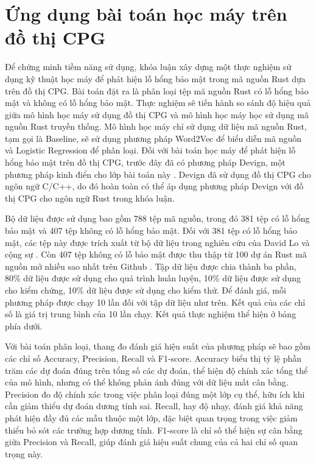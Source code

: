 \section{Ứng dụng bài toán học máy trên đồ thị CPG}


Để chứng minh tiềm năng sử dụng, khóa luận xây dựng một thực nghiệm sử dụng kỹ thuật học máy để phát hiện lỗ hổng bảo mật trong mã nguồn Rust dựa trên đồ thị CPG.
Bài toán đặt ra là phân loại tệp mã nguồn Rust có lỗ hổng bảo mật và không có lỗ hổng bảo mật.
Thực nghiệm sẽ tiến hành so sánh độ hiệu quả giữa mô hình học máy sử dụng đồ thị CPG và mô hình học máy học sử dụng mã nguồn Rust truyền thống.
Mô hình học máy chỉ sử dụng dữ liệu mã nguồn Rust, tạm gọi là Baseline, sẽ sử dụng phương pháp Word2Vec \cite{church2017word2vec} để biểu diễn mã nguồn và Logistic Regression \cite{lavalley2008logistic} để phân loại.
Đối với bài toán học máy để phát hiện lỗ hổng bảo mật trên đồ thị CPG, trước đây đã có phương pháp Devign, một phương pháp kinh điển cho lớp bài toán này \cite{zhou2019devign}.
Devign đã sử dụng đồ thị CPG cho ngôn ngữ C/C++, do đó hoàn toàn có thể áp dụng phương pháp Devign với đồ thị CPG cho ngôn ngữ Rust trong khóa luận.

Bộ dữ liệu được sử dụng bao gồm 788 tệp mã nguồn, trong đó 381 tệp có lỗ hổng bảo mật và 407 tệp không có lỗ hổng bảo mật.
Đối với 381 tệp có lỗ hổng bảo mật, các tệp này được trích xuất từ bộ dữ liệu trong nghiên cứu của David Lo và cộng sự \cite{zheng2023closer}.
Còn 407 tệp không có lỗ bảo mật được thu thập từ 100 dự án Rust  mã nguồn mở nhiều sao nhất trên Github \cite{githubGithubRankingTop100RustmdMaster}.
Tập dữ liệu được chia thành ba phần, 80\% dữ liệu được sử dụng cho quá trình huấn luyện, 10\% dữ liệu được sử dụng cho kiểm chứng, 10\% dữ liệu được sử dụng cho kiểm thử.
Để đánh giá, mỗi phương pháp được chạy 10 lần đối với tập dữ liệu như trên.
Kết quả của các chỉ số là giá trị trung bình của 10 lần chạy.
Kết quả thực nghiệm thể hiện ở bảng phía dưới.

Với bài toán phân loại, thang đo đánh giá hiệu suất của phương pháp sẽ bao gồm các chỉ số Accuracy, Precision, Recall và F1-score.
Accuracy biểu thị tỷ lệ phần trăm các dự đoán đúng trên tổng số các dự đoán, thể hiện độ chính xác tổng thể của mô hình, nhưng có thể không phản ánh đúng với dữ liệu mất cân bằng.
Precision đo độ chính xác trong việc phân loại đúng một lớp cụ thể, hữu ích khi cần giảm thiểu dự đoán dương tính sai.
Recall, hay độ nhạy, đánh giá khả năng phát hiện đầy đủ các mẫu thuộc một lớp, đặc biệt quan trọng trong việc giảm thiểu bỏ sót các trường hợp dương tính.
F1-score là chỉ số thể hiện sự cân bằng giữa Precision và Recall, giúp đánh giá hiệu suất chung của cả hai chỉ số quan trọng này.


